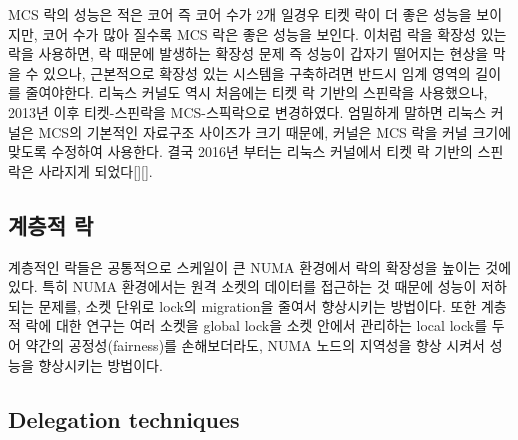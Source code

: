 MCS 락의 성능은 적은 코어 즉 코어 수가 2개 일경우 티켓 락이 더 좋은 성능을 보이지만, 
코어 수가 많아 질수록 MCS 락은 좋은 성능을 보인다. 
이처럼 락을 확장성 있는 락을 사용하면, 락 때문에 발생하는 확장성 문제 즉 성능이 갑자기 떨어지는 현상을 
막을 수 있으나, 근본적으로 확장성 있는 시스템을 구축하려면 반드시 임계 영역의 길이를 줄여야한다.
리눅스 커널도 역시 처음에는 티켓 락 기반의 스핀락을 사용했으나, 2013년 이후 티켓-스핀락을 MCS-스픽락으로 
변경하였다. 
엄밀하게 말하면 리눅스 커널은 MCS의 기본적인 자료구조 사이즈가 크기 때문에, 커널은 MCS 락을 커널 크기에 
맞도록 수정하여 사용한다. 
결국 2016년 부터는  리눅스 커널에서 티켓 락 기반의 스핀락은 사라지게 되었다[][].
 
 
 
      

\subsection{계층적 락}

계층적인 락들은 공통적으로 스케일이 큰 NUMA 환경에서 락의 확장성을 높이는 것에 있다. 
특히 NUMA 환경에서는 원격 소켓의 데이터를 접근하는 것 때문에 성능이 저하되는 문제를,
소켓 단위로 lock의 migration을 줄여서 향상시키는 방법이다.
또한 계층적 락에 대한 연구는 여러 소켓을 global lock을 소켓 안에서 관리하는 
local lock를 두어 약간의 공정성(fairness)를 손해보더라도, 
NUMA 노드의 지역성을 향상 시켜서 성능을 향상시키는 방법이다.

\subsection{Delegation techniques}

